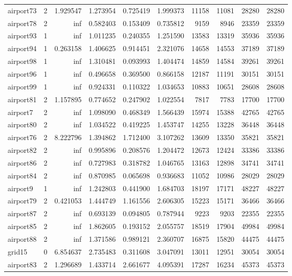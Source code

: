\begin{longtable}{|l|r|r|r|r|r|r|r|r|r|}
airport73 & 2 & 1.929547 & 1.273954 & 0.725419 & 1.999373 & 11158 & 11081 & 28280 & 28280 \\
airport78 & 2 & inf & 0.582403 & 0.153409 & 0.735812 & 9159 & 8946 & 23359 & 23359 \\
airport93 & 1 & inf & 1.011235 & 0.240355 & 1.251590 & 13583 & 13319 & 35936 & 35936 \\
airport94 & 1 & 0.263158 & 1.406625 & 0.914451 & 2.321076 & 14658 & 14553 & 37189 & 37189 \\
airport98 & 1 & inf & 1.310481 & 0.093993 & 1.404474 & 14859 & 14584 & 39261 & 39261 \\
airport96 & 1 & inf & 0.496658 & 0.369500 & 0.866158 & 12187 & 11191 & 30151 & 30151 \\
airport99 & 1 & inf & 0.924331 & 0.110322 & 1.034653 & 10883 & 10651 & 28608 & 28608 \\
airport81 & 2 & 1.157895 & 0.774652 & 0.247902 & 1.022554 & 7817 & 7783 & 17700 & 17700 \\
airport7 & 2 & inf & 1.098090 & 0.468349 & 1.566439 & 15974 & 15388 & 42765 & 42765 \\
airport80 & 2 & inf & 1.034522 & 0.419225 & 1.453747 & 14255 & 13228 & 36448 & 36448 \\
airport76 & 2 & 8.222796 & 1.394862 & 1.712400 & 3.107262 & 13609 & 13350 & 35821 & 35821 \\
airport82 & 2 & inf & 0.995896 & 0.208576 & 1.204472 & 12673 & 12424 & 33386 & 33386 \\
airport86 & 2 & inf & 0.727983 & 0.318782 & 1.046765 & 13163 & 12898 & 34741 & 34741 \\
airport84 & 2 & inf & 0.870985 & 0.065698 & 0.936683 & 11052 & 10986 & 28029 & 28029 \\
airport9 & 1 & inf & 1.242803 & 0.441900 & 1.684703 & 18197 & 17171 & 48227 & 48227 \\
airport79 & 2 & 0.421053 & 1.444749 & 1.161556 & 2.606305 & 15223 & 15171 & 36466 & 36466 \\
airport87 & 2 & inf & 0.693139 & 0.094805 & 0.787944 & 9223 & 9203 & 22355 & 22355 \\
airport85 & 2 & inf & 1.862605 & 0.193152 & 2.055757 & 18519 & 17904 & 49984 & 49984 \\
airport88 & 2 & inf & 1.371586 & 0.989121 & 2.360707 & 16875 & 15820 & 44475 & 44475 \\
grid15 & 0 & 6.854637 & 2.735483 & 0.311608 & 3.047091 & 13011 & 12951 & 30054 & 30054 \\
airport83 & 2 & 1.296689 & 1.433714 & 2.661677 & 4.095391 & 17287 & 16234 & 45373 & 45373 \\

\end{longtable}
